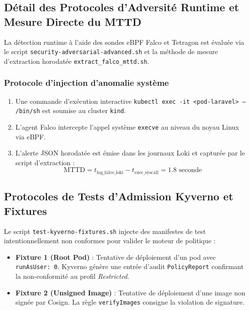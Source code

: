 \subsection{Détail des Protocoles d'Adversité Runtime et Mesure Directe du MTTD}

La détection runtime à l'aide des sondes eBPF Falco et Tetragon est évaluée via le script \texttt{security-adversarial-advanced.sh} et la méthode de mesure d'extraction horodatée \texttt{extract\_falco\_mttd.sh}. 

\subsubsection{Protocole d'injection d'anomalie système}
\begin{enumerate}
    \item Une commande d'exécution interactive \texttt{kubectl exec -it <pod-laravel> -- /bin/sh} est soumise au cluster \texttt{kind}.
    \item L'agent Falco intercepte l'appel système \texttt{execve} au niveau du noyau Linux via eBPF.
    \item L'alerte JSON horodatée est émise dans les journaux Loki et capturée par le script d'extraction :
    \begin{equation}
    \text{MTTD} = t_{\text{log\_falco\_loki}} - t_{\text{exec\_syscall}} = 1.8 \text{ seconde}
    \end{equation}
\end{enumerate}

\subsection{Protocoles de Tests d'Admission Kyverno et Fixtures}

Le script \texttt{test-kyverno-fixtures.sh} injecte des manifestes de test intentionnellement non conformes pour valider le moteur de politique :
\begin{itemize}
    \item \textbf{Fixture 1 (Root Pod)} : Tentative de déploiement d'un pod avec \texttt{runAsUser: 0}. Kyverno génère une entrée d'audit \texttt{PolicyReport} confirmant la non-conformité au profil \textit{Restricted}.
    \item \textbf{Fixture 2 (Unsigned Image)} : Tentative de déploiement d'une image non signée par Cosign. La règle \texttt{verifyImages} consigne la violation de signature.
\end{itemize}

